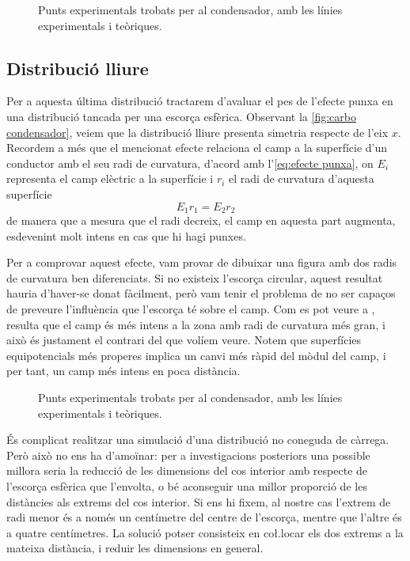 \begin{figure}[htb]
  \centering \small \sffamily
	
  \caption{ Punts experimentals trobats per al condensador, amb les línies experimentals i teòriques.}
  \label{fig:camp fils}
\end{figure}

\subsection{Distribució lliure}
Per a aquesta última distribució tractarem d'avaluar el pes de l'efecte punxa en una distribució tancada per una escorça esfèrica. Observant la \cref{fig:carbo condensador}, veiem que la distribució lliure presenta simetria respecte de l'eix $x$. Recordem a més que el mencionat efecte relaciona el camp a la superfície d'un conductor amb el seu radi de curvatura, d'acord amb l'\cref{eq:efecte punxa}, on $E_i$ representa el camp elèctric a la superfície i $r_i$ el radi de curvatura d'aquesta superfície
\begin{equation} \label{eq:efecte punxa}
	E_1r_1=E_2r_2
\end{equation}
de manera que a mesura que el radi decreix, el camp en aquesta part augmenta, esdevenint molt intens en cas que hi hagi punxes.

Per a comprovar aquest efecte, vam provar de dibuixar una figura amb dos radis de curvatura ben diferenciats. Si no existeix l'escorça circular, aquest resultat hauria d'haver-se donat fàcilment, però vam tenir el problema de no ser capaços de preveure l'influència que l'escorça té sobre el camp. Com es pot veure a , resulta que el camp és més intens a la zona amb radi de curvatura més gran, i això és justament el contrari del que volíem veure. Notem que superfícies equipotencials més properes implica un canvi més ràpid del mòdul del camp, i per tant, un camp més intens en poca distància.

\begin{figure}[htb]
  \centering \small \sffamily
	
  \caption{ Punts experimentals trobats per al condensador, amb les línies experimentals i teòriques.}
  \label{fig:camp lliure}
\end{figure}

És complicat realitzar una simulació d'una distribució no coneguda de càrrega. Però això no ens ha d'amoïnar: per a investigacions posteriors una possible millora seria la reducció de les dimensions del cos interior amb respecte de l'escorça esfèrica que l'envolta, o bé aconseguir una millor proporció de les distàncies als extrems del cos interior. Si ens hi fixem, al nostre cas l'extrem de radi menor és a només un centímetre del centre de l'escorça, mentre que l'altre és a quatre centímetres. La solució potser consisteix en co\l.locar els dos extrems a la mateixa distància, i reduir les dimensions en general.
